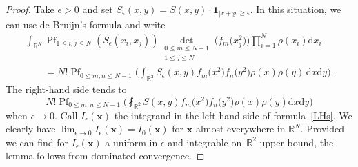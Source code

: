 \documentclass[pdftex]{sigma}
\numberwithin{equation}{section}
\newcommand{\dd}{\mathrm{d}}
\begin{document}
\begin{proof} Take $\epsilon > 0$ and set $S_{\epsilon}(x,y) = S(x,y) \cdot \mathbf{1}_{|x + y| \geq \epsilon}$. In this situation, we can use de Bruijn's formula and write
\begin{gather}
\nonumber \int_{\mathbb{R}^N} \operatorname{Pf}_{1 \leq i,j \leq N} (S_{\epsilon}(x_i,x_j)) \mathop{\det}_{\substack{0 \leq m \leq N - 1 \\ 1 \leq j \leq N}} \bigl(f_m\bigl(x_j^2\bigr)\bigr) \prod_{i = 1}^N \rho(x_i)\dd x_i \\
\qquad {} = N!\operatorname{Pf}_{0 \leq m,n \leq N - 1} \biggl(\int_{\mathbb{R}^2} S_{\epsilon}(x,y)f_m\bigl(x^2\bigr)f_n\bigl(y^2\bigr)\rho(x)\rho(y)\,\dd x \dd y\biggr).\label{LHs}
\end{gather}
The right-hand side tends to
\[
N! \operatorname{Pf}_{0 \leq m,n \leq N - 1} \biggl(\fint_{\mathbb{R}^2} S(x,y) f_m\bigl(x^2\bigr)f_n\bigl(y^2\bigr)\rho(x)\rho(y)\dd x \dd y\biggr)
\]
 when ${\epsilon \rightarrow 0}$. Call $I_{\epsilon}(\mathbf{x})$ the integrand in the left-hand side of formula~\eqref{LHs}. We clearly have $\lim_{\epsilon \rightarrow 0} I_{\epsilon}(\mathbf{x}) = I_0(\mathbf{x})$ for $\mathbf{x}$ almost everywhere in $\mathbb{R}^N$. Provided we can find for $I_{\epsilon}(\mathbf{x})$ a uniform in $\epsilon$ and integrable on~$\mathbb{R}^2$ upper bound, the lemma follows from dominated convergence.


\end{proof}
\end{document}
